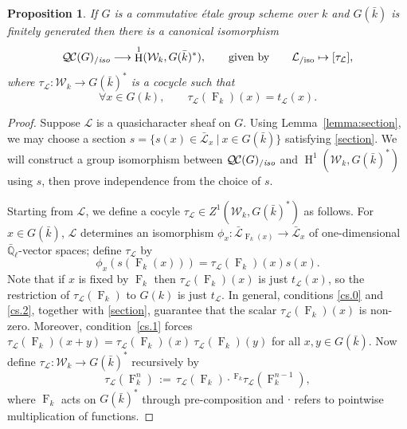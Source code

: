 \documentclass[11pt]{amsart}
\theoremstyle{plain}
\newtheorem{proposition}[theorem]{Proposition}
\theoremstyle{definition}
\theoremstyle{remark}
\newcommand{\EE}{\mathbb{\bar Q}_\ell}
\newcommand{\bFq}{\bar{k}}
\newcommand{\Fq}{k}
\newcommand{\Frob}[1]{\operatorname{F}_{#1}}
\DeclareMathOperator{\Hh}{H}
\newcommand{\ceq}{{\, :=\, }}
\newcommand{\tq}{{\ \vert\ }}
\newcommand{\qcs}[1]{{\mathcal{#1}}}
\newcommand{\gqcs}[1]{{\mathcal{\bar #1}}}
\newcommand{\QC}{{\mathcal{Q\hskip-0.8pt C}}}
\newcommand{\QCiso}[1]{\QC(#1)_{/\textit{iso}}}
\newcommand{\Weil}[1]{\mathcal{W}_{#1}}
\newcommand{\trFrob}[1]{t_{#1}}
\begin{document}
\begin{proposition}\label{prop:etale}
  If $G$ is a commutative \'etale group scheme over $\Fq$ and
  $G(\bFq)$ is finitely generated then there is a canonical
  isomorphism
  \[
  \QCiso{G} \longrightarrow \Hh^1(\Weil{\Fq}, G(\bFq)^*),
  \qquad \text{given by}\qquad
  \qcs{L}_{/\text{iso}} \mapsto [\tau_\qcs{L}],
  \]
  where $\tau_\qcs{L}: \Weil{\Fq}\to G(\bFq)^*$ is a cocycle such that
  \[
  \forall x\in G(\Fq), \qquad \tau_\qcs{L}(\Frob{\Fq})(x) = \trFrob{\qcs{L}}(x).
  \]
\end{proposition}

\begin{proof}
  Suppose $\qcs{L}$ is a quasicharacter sheaf on $G$.  
  Using Lemma~\ref{lemma:section}, 
  we may choose a section $s = \{ s(x) \in \gqcs{L}_x \tq x \in G(\bFq) \}$ satisfying \eqref{section}.
  We will construct a group isomorphism between $\QCiso{G}$ and
  $\Hh^1(\Weil{\Fq}, G(\bFq)^*)$ using $s$, then prove independence from the choice of $s$.

  Starting from $\qcs{L}$, we define a cocyle $\tau_{\qcs{L}} \in Z^1(\Weil{\Fq},G(\bFq)^*)$ as follows.
  For $x \in G(\bFq)$, $\qcs{L}$ determines an isomorphism $\phi_x : \gqcs{L}_{\Frob{\Fq}(x)} \to \gqcs{L}_x$
  of one-dimensional $\EE$-vector spaces; define $\tau_\qcs{L}$ by
  \begin{equation}\label{t}
   \phi_{x}(s(\Frob{\Fq}(x))) = \tau_\qcs{L}(\Frob{\Fq})(x) s(x).
  \end{equation}
  Note that if $x$ is fixed by $\Frob{k}$ then $\tau_\qcs{L}(\Frob{\Fq})(x)$ is just $\trFrob{\qcs{L}}(x)$, so the restriction of
  $\tau_\qcs{L}(\Frob{k})$ to $G(k)$ is just $\trFrob{\qcs{L}}$.
  In general, conditions \ref{cs.0} and \ref{cs.2}, together with \eqref{section}, guarantee that
  the scalar $\tau_\qcs{L}(\Frob{k})(x)$ is non-zero.  Moreover, condition~\ref{cs.1} forces
  $\tau_\qcs{L}(\Frob{\Fq})(x+y) = \tau_\qcs{L}(\Frob{\Fq})(x) \ \tau_\qcs{L}(\Frob{\Fq})(y)$
  for all $x,y \in G(\bFq)$.  Now define $\tau_\qcs{L} : \Weil{\Fq} \to G(\bFq)^*$ recursively by
  \[
   \tau_\qcs{L}(\Frob{\Fq}^n) \ceq \tau_\qcs{L}(\Frob{\Fq})\cdot \,^{\Frob{\Fq}} \tau_\qcs{L}(\Frob{\Fq}^{n-1}),
  \]
  where $\Frob{\Fq}$ acts on $G(\bFq)^*$ through pre-composition and $\cdot$ refers
  to pointwise multiplication of functions.


\end{proof}
\end{document}
